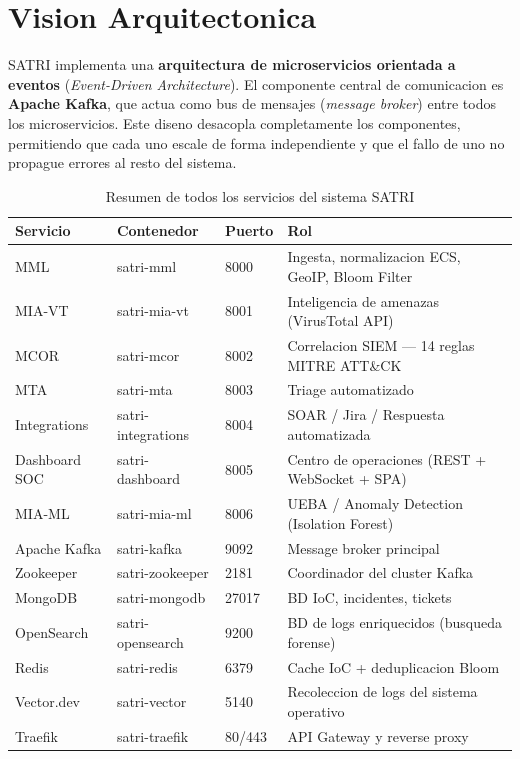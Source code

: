 \documentclass[12pt, a4paper]{report}
\begin{document}
\section{Vision Arquitectonica}

SATRI implementa una \textbf{arquitectura de microservicios orientada a eventos} (\textit{Event-Driven Architecture}). El componente central de comunicacion es \textbf{Apache Kafka}, que actua como bus de mensajes (\textit{message broker}) entre todos los microservicios. Este diseno desacopla completamente los componentes, permitiendo que cada uno escale de forma independiente y que el fallo de uno no propague errores al resto del sistema.

\begin{table}[H]
\centering
\caption{Resumen de todos los servicios del sistema SATRI}
\begin{tabular}{@{}p{2.8cm}p{3cm}p{1.5cm}p{5cm}@{}}
\toprule
\textbf{Servicio} & \textbf{Contenedor} & \textbf{Puerto} & \textbf{Rol} \\
\midrule
MML               & satri-mml          & 8000 & Ingesta, normalizacion ECS, GeoIP, Bloom Filter \\
MIA-VT            & satri-mia-vt       & 8001 & Inteligencia de amenazas (VirusTotal API) \\
MCOR              & satri-mcor         & 8002 & Correlacion SIEM --- 14 reglas MITRE ATT\&CK \\
MTA               & satri-mta          & 8003 & Triage automatizado \\
Integrations      & satri-integrations & 8004 & SOAR / Jira / Respuesta automatizada \\
Dashboard SOC     & satri-dashboard    & 8005 & Centro de operaciones (REST + WebSocket + SPA) \\
MIA-ML            & satri-mia-ml       & 8006 & UEBA / Anomaly Detection (Isolation Forest) \\
\midrule
Apache Kafka      & satri-kafka        & 9092 & Message broker principal \\
Zookeeper         & satri-zookeeper    & 2181 & Coordinador del cluster Kafka \\
MongoDB           & satri-mongodb      & 27017 & BD IoC, incidentes, tickets \\
OpenSearch        & satri-opensearch   & 9200 & BD de logs enriquecidos (busqueda forense) \\
Redis             & satri-redis        & 6379 & Cache IoC + deduplicacion Bloom \\
Vector.dev        & satri-vector       & 5140 & Recoleccion de logs del sistema operativo \\
Traefik           & satri-traefik      & 80/443 & API Gateway y reverse proxy \\
\bottomrule
\end{tabular}
\end{table}
\end{document}
